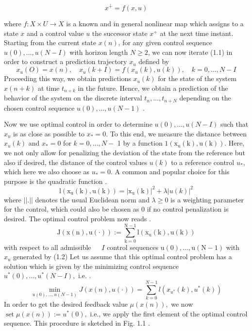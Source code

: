 \documentclass{UoNMCHA}
\numberwithin{equation}{section}
\begin{document}
	\begin{equation} \label{eq/states}
	x^{\dotplus}=f(x,u)
	\end{equation}
	
	where $f: X \times U \rightarrow X$ is a known and in general nonlinear map which assigns to a state $x$ and a control
	value $u$ the successor state $x^{+}$ at the next time instant. Starting
	from the current state $x(n)$, for any given control sequence $u(0), \ldots, u(N-I)$ with horizon length
	$N \geq 2$, we can now iterate (1.1) in order to construct a prediction trajectory $x_{u}$ defined by
	$$
	x_{u}(O)=x(n), \quad x_{u}(k+I)=f\left(x_{u}(k), u(k)\right), \quad k=0, \ldots, N-I
	$$
	Proceeding this way, we obtain predictions $x_{u}(k)$ for the state of the system $x(n+k)$ at time $t_{n+k}$ in
	the future. Hence, we obtain a prediction of the behavior of the system on the discrete interval
	$t_{n}, \ldots, t_{n+N}$ depending on the chosen control sequence $u(0), \ldots, u(N-1)$ \cite{larsgrune_2017_nonlinear}.
	
	Now we use optimal control in order to determine $u(0), \ldots, u(N-I)$ such that $x_{u}$ is as close as
	possible to $x_{*}=0 .$ To this end, we measure the distance between $x_{u}(k)$ and $x_{*}=0$ for $k=0, \ldots, N-$ 1 by a function $1\left(\mathrm{x}_{\mathrm{u}}(\mathrm{k}), \mathrm{u}(\mathrm{k})\right)$. Here, we not only allow for penalizing the deviation of the state from
	the reference but also if desired, the distance of the control values $u(k)$ to a reference control $u_{*}$, which
	here we also choose as $u_{*}=0 .$ A common and popular choice for this purpose is the quadratic function \cite{larsgrune_2017_nonlinear}.
	$$
	\mathrm{l}\left(\mathrm{x}_{\mathrm{u}}(\mathrm{k}), \mathrm{u}(\mathrm{k})\right)=\left|\mathrm{x}_{\mathrm{u}}(\mathrm{k})\right|^{2}+\lambda|u(k)|^{2}
	$$
	where $|| . ||$ denotes the usual Euclidean norm and $\lambda \geq 0$ is a weighting parameter for the control, which
	could also be chosen as 0 if no control penalization is desired.
	The optimal control problem now reads \cite{larsgrune_2017_nonlinear}.
	$$
	\mathrm{J}(\mathrm{x}(\mathrm{n}), \mathrm{u}(\cdot)):=\sum_{\mathrm{k}=0}^{\mathrm{N}-1} \mathrm{l}\left(\mathrm{x}_{\mathrm{u}}(\mathrm{k}), \mathrm{u}(\mathrm{k})\right)
	$$
	with respect to all admissible $\ \quad I$ control sequences $\mathrm{u}(0), \ldots, \mathrm{u}(\mathrm{N}-1)$ with $x_{u}$ generated by (1.2)
	Let us assume that this optimal control problem has a solution which is given by the minimizing control
	sequence $u^{*}(0), \ldots, u^{*}(N-I),$ i.e. \cite{larsgrune_2017_nonlinear}.
	$$
	\min _{u(0), \ldots, u(N-1)} J(x(n), u(\cdot))=\sum_{k=0}^{N-1} l\left(x_{u^{*}}(k), u^{*}(k)\right)
	$$
	In order to get the desired feedback value $\mu(x(n)),$ we now $\operatorname{set} \mu(x(n)):=u^{*}(0),$
	i.e., we apply the first element of the optimal control sequence. This procedure is sketched in Fig. 1.1 .
	
\end{document}
